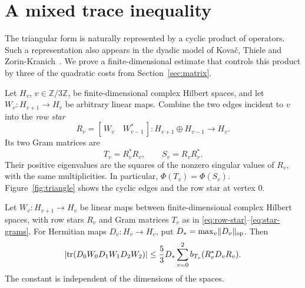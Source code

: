 \section{A mixed trace inequality}\label{sec:trace}

The triangular form is naturally represented by a cyclic product of
operators. Such a representation also appears in the dyadic model of
Kova\v{c}, Thiele and Zorin-Kranich~\cite[Equation~(1.5)]{KovacThieleZorinKranich2015}.
We prove a finite-dimensional estimate that controls this product by
three of the quadratic costs from Section~\ref{sec:matrix}.

Let $H_v$, $v\in\mathbb Z/3\mathbb Z$, be finite-dimensional complex
Hilbert spaces, and let $W_v:H_{v+1}\to H_v$ be arbitrary linear maps.
Combine the two edges incident to $v$ into the \emph{row star}
\begin{equation}\label{eq:row-star}
 R_v=[\,W_v\quad W_{v-1}^*\,]:
 H_{v+1}\oplus H_{v-1}\longrightarrow H_v.
\end{equation}
Its two Gram matrices are
\begin{equation}\label{eq:star-grams}
 T_v=R_v^*R_v,\qquad S_v=R_vR_v^*.
\end{equation}
Their positive eigenvalues are the squares of the nonzero singular
values of $R_v$, with the same multiplicities. In particular,
$\Phi(T_v)=\Phi(S_v)$.
Figure~\ref{fig:triangle} shows the cyclic edges and the row star at
vertex $0$.


\begin{lemma}\label{lem:mixed-trace}
Let $W_v:H_{v+1}\to H_v$ be linear maps between finite-dimensional
complex Hilbert spaces, with row stars $R_v$ and Gram matrices $T_v$
as in \eqref{eq:row-star}--\eqref{eq:star-grams}.
For Hermitian maps $D_v:H_v\to H_v$, put
$D_* =\max_v\lVert D_v\rVert_{\mathrm{op}}$. Then
\begin{equation}\label{eq:mixed-trace}
 \left|\operatorname{tr}(D_0W_0D_1W_1D_2W_2)\right|
 \le \frac53D_*\sum_{v=0}^2
 b_{T_v}(R_v^*D_vR_v).
\end{equation}
The constant is independent of the dimensions of the spaces.
\end{lemma}

